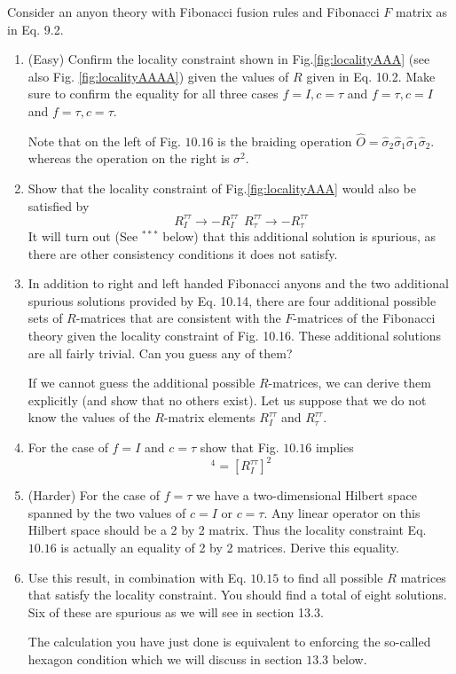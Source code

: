 \documentclass{book}
\begin{document}
Consider an anyon theory with Fibonacci fusion rules and Fibonacci $F$ matrix as in Eq. 9.2.
\begin{enumerate}
\item (Easy) Confirm the locality constraint shown in Fig.\ref{fig:localityAAA} (see also Fig. \ref{fig:localityAAAA}) given the values of $R$ given in Eq. 10.2. Make sure to confirm the equality for all three cases $f=I,c=\tau $ and $f=\tau ,c=I$ and $f=\tau ,c=\tau $. 

Note that on the left of Fig. $10.16$ is the braiding operation $\hat{O} =\hat{\sigma }_{2}\hat{\sigma }_{1}\hat{\sigma }_{1}\hat{\sigma }_{2}$. whereas the operation on the right is $\sigma ^{2}$.
\item Show that the locality constraint of Fig.\ref{fig:localityAAA} would also be satisfied by\begin{equation*}
R_{I}^{\tau \tau }\rightarrow -R_{I}^{\tau \tau } \ \ R_{\tau }^{\tau \tau }\rightarrow -R_{\tau }^{\tau \tau }
\end{equation*}It will turn out (See $^{***}$ below) that this additional solution is spurious, as there are other consistency conditions it does not satisfy.
\item In addition to right and left handed Fibonacci anyons and the two additional spurious solutions provided by Eq. 10.14, there are four additional possible sets of $R$-matrices that are consistent with the $F$-matrices of the Fibonacci theory given the locality constraint of Fig. 10.16. These additional solutions are all fairly trivial. Can you guess any of them?

If we cannot guess the additional possible $R$-matrices, we can derive them explicitly (and show that no others exist). Let us suppose that we do not know the values of the $R$-matrix elements $R_{I}^{\tau \tau }$ and $R_{\tau }^{\tau \tau }$.
\item For the case of $f=I$ and $c=\tau $ show that Fig. $10.16$ implies\begin{equation*}
[R_{\tau }^{\tau \tau } ]^{4} =[R_{I}^{\tau \tau } ]^{2}
\end{equation*}
\item (Harder) For the case of $f=\tau $ we have a two-dimensional Hilbert space spanned by the two values of $c=I$ or $c=\tau $. Any linear operator on this Hilbert space should be a 2 by 2 matrix. Thus the locality constraint Eq. $10.16$ is actually an equality of 2 by 2 matrices. Derive this equality.
\item Use this result, in combination with Eq. $10.15$ to find all possible $R$ matrices that satisfy the locality constraint. You should find a total of eight solutions. Six of these are spurious as we will see in section 13.3.

The calculation you have just done is equivalent to enforcing the so-called hexagon condition which we will discuss in section $13.3$ below.
\end{enumerate}
\end{document}
